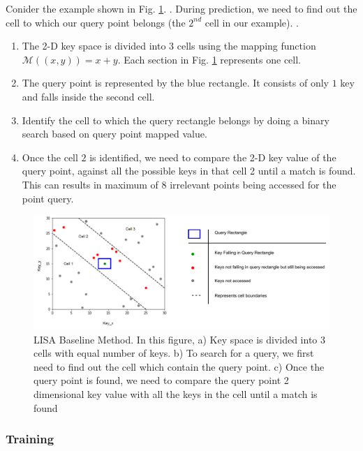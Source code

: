 \begin{mscexample}
Conider the example shown in Fig. \ref{fig:BaseLine_Method}. . During prediction, we need to find out the cell to which our query point belongs (the $2^{nd}$ cell in our example). .

	\begin{enumerate}
		\item The 2-D key space is divided into 3 cells using the mapping function $\mathcal{M}((x,y))= x+y$. Each section in Fig. \ref{fig:BaseLine_Method} represents one cell. 
		\item The query point is represented by the blue rectangle. It consists of only $1$ key and falls inside the second cell. 
		\item Identify the cell to which the query rectangle belongs by doing a binary search based on query point mapped value. 
		\item Once the cell $2$ is identified, we need to compare the 2-D key value of the query point, against all the possible keys in that cell 2 until a match is found. This can results in maximum of $8$ irrelevant points being accessed for the point query.
	\end{enumerate}
\end{mscexample}

\begin{figure}[t]
    \centering
    \includegraphics[width=1.1\textwidth]{graphs/implementation/Baseline_limitation_chen_limitation.pdf}
    \caption{LISA Baseline Method. In this figure, a) Key space is divided into 3 cells with equal number of keys. b) To search for a query, we first need to find out the cell which contain the query point. c) Once the query point is found, we need to compare the query point 2 dimensional key value with all the keys in the cell until a match is found}
    \label{fig:BaseLine_Method}
\end{figure}
\subsubsection{Training}

